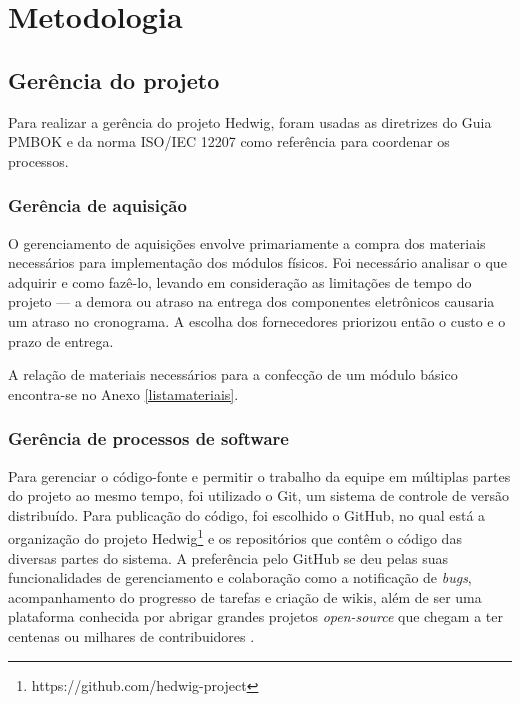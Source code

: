 \chapter{Metodologia}

\section{Gerência do projeto}
Para realizar a gerência do projeto Hedwig, foram usadas as diretrizes do Guia PMBOK \cite{pmi} e da norma ISO/IEC 12207 \cite{iso12207} como referência para coordenar os processos.


\subsection{Gerência de aquisição}

O gerenciamento de aquisições envolve primariamente a compra dos materiais necessários para implementação dos módulos físicos. Foi necessário analisar o que adquirir e como fazê-lo, levando em consideração as limitações de tempo do projeto --- a demora ou atraso na entrega dos componentes eletrônicos causaria um atraso no cronograma. A escolha dos fornecedores priorizou então o custo e o prazo de entrega.

A relação de materiais necessários para a confecção de um módulo básico encontra-se no Anexo \ref{listamateriais}.

\subsection{Gerência de processos de software}

Para gerenciar o código-fonte e permitir o trabalho da equipe em múltiplas partes do projeto ao mesmo tempo, foi utilizado o Git, um sistema de controle de versão distribuído. Para publicação do código, foi escolhido o GitHub, no qual está a organização do projeto Hedwig\footnote{https://github.com/hedwig-project} e os repositórios que contêm o código das diversas partes do sistema. A preferência pelo GitHub se deu pelas suas funcionalidades de gerenciamento e colaboração como a notificação de \emph{bugs}, acompanhamento do progresso de tarefas e criação de wikis, além de ser uma plataforma conhecida por abrigar grandes projetos \emph{open-source} que chegam a ter centenas ou milhares de contribuidores \cite{github}.

